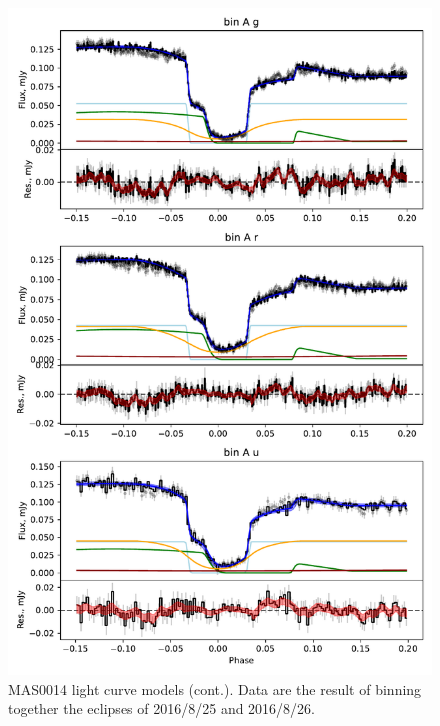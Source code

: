 \begin{figure}
    \centering
    \includegraphics[width=\textwidth]{figures/results/MASOT0014/MASOT0014_3.pdf}
    \caption{MAS0014 light curve models (cont.). Data are the result of binning together the eclipses of 2016/8/25 and 2016/8/26.}
    \label{fig:MAS0014 all light curves cont 2}
\end{figure}

